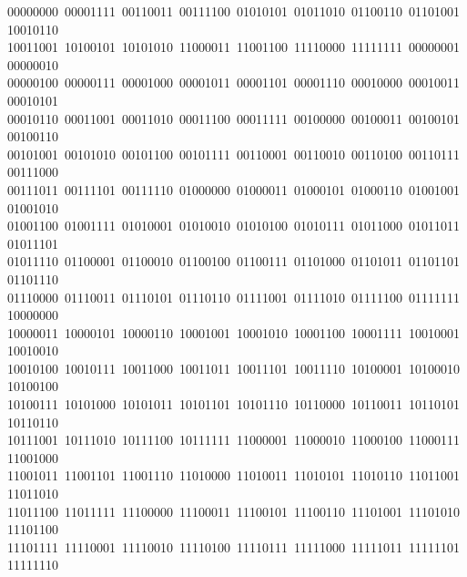 \begin{flushleft}\footnotesize\ttfamily
{}\ 00000000\ 00001111\ 00110011\ 00111100\ 01010101\ 01011010\ 01100110\ 01101001\ 10010110\\
\ 10011001\ 10100101\ 10101010\ 11000011\ 11001100\ 11110000\ 11111111\ 00000001\ 00000010\\
\ 00000100\ 00000111\ 00001000\ 00001011\ 00001101\ 00001110\ 00010000\ 00010011\ 00010101\\
\ 00010110\ 00011001\ 00011010\ 00011100\ 00011111\ 00100000\ 00100011\ 00100101\ 00100110\\
\ 00101001\ 00101010\ 00101100\ 00101111\ 00110001\ 00110010\ 00110100\ 00110111\ 00111000\\
\ 00111011\ 00111101\ 00111110\ 01000000\ 01000011\ 01000101\ 01000110\ 01001001\ 01001010\\
\ 01001100\ 01001111\ 01010001\ 01010010\ 01010100\ 01010111\ 01011000\ 01011011\ 01011101\\
\ 01011110\ 01100001\ 01100010\ 01100100\ 01100111\ 01101000\ 01101011\ 01101101\ 01101110\\
\ 01110000\ 01110011\ 01110101\ 01110110\ 01111001\ 01111010\ 01111100\ 01111111\ 10000000\\
\ 10000011\ 10000101\ 10000110\ 10001001\ 10001010\ 10001100\ 10001111\ 10010001\ 10010010\\
\ 10010100\ 10010111\ 10011000\ 10011011\ 10011101\ 10011110\ 10100001\ 10100010\ 10100100\\
\ 10100111\ 10101000\ 10101011\ 10101101\ 10101110\ 10110000\ 10110011\ 10110101\ 10110110\\
\ 10111001\ 10111010\ 10111100\ 10111111\ 11000001\ 11000010\ 11000100\ 11000111\ 11001000\\
\ 11001011\ 11001101\ 11001110\ 11010000\ 11010011\ 11010101\ 11010110\ 11011001\ 11011010\\
\ 11011100\ 11011111\ 11100000\ 11100011\ 11100101\ 11100110\ 11101001\ 11101010\ 11101100\\
\ 11101111\ 11110001\ 11110010\ 11110100\ 11110111\ 11111000\ 11111011\ 11111101\ 11111110\\

\end{flushleft}
